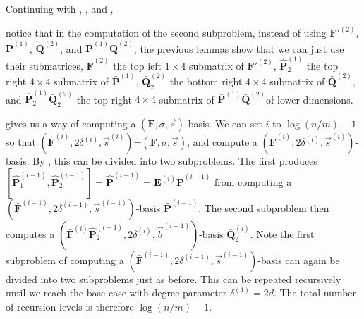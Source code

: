 \begin{example}
Continuing with , ,
and , %
\begin{comment}
notice that after the first subproblem, the second subproblem of computing
$\bar{\mathbf{Q}}^{(2)}$ in \prettyref{exm:subproblems} is really
a smaller problem of computing the lower right $4\times4$ submatrix
$\bar{\mathbf{Q}}_{2}^{(2)}$, which is a $(\bar{\mathbf{F}}^{\left(2\right)}\hat{\mathbf{P}}_{2}^{\left(1\right)},8,\vec{b}^{\left(1\right)})$-basis
(or equivalently a $(\mathbf{F}'^{\left(2\right)}\bar{\mathbf{P}}_{2}^{\left(1\right)},[8,4,4],\vec{b}^{\left(1\right)})$-basis),
where $\bar{\mathbf{P}}_{2}^{\left(1\right)}$ is the last $4$ columns
of $\bar{\mathbf{P}}^{(1)}$, $\vec{b}^{(1)}=[2,3,3,3]$ is the list
of column degrees of $\bar{\mathbf{P}}_{2}^{(1)}$, and $\hat{\mathbf{P}}_{2}^{\left(1\right)}$
is the first $4$ rows of $\bar{\mathbf{P}}_{2}^{(1)}$. 
\end{comment}
notice that in the computation of the second subproblem, instead of
using $\mathbf{F}'^{\left(2\right)},$ $\bar{\mathbf{P}}^{\left(1\right)}$,
$\bar{\mathbf{Q}}^{(2)}$, and $\bar{\mathbf{P}}^{(1)}\bar{\mathbf{Q}}^{(2)}$,
the previous lemmas show that we can just use their submatrices, $\bar{\mathbf{F}}^{(2)}$
the top left $1\times4$ submatrix of $\mathbf{F}'^{\left(2\right)}$,
$\hat{\mathbf{P}}_{2}^{(1)}$ the top right $4\times4$ submatrix
of $\bar{\mathbf{P}}^{(1)}$, $\bar{\mathbf{Q}}_{2}^{(2)}$ the bottom
right $4\times4$ submatrix of $\bar{\mathbf{Q}}^{(2)}$, and $\hat{\mathbf{P}}_{2}^{(1)}\bar{\mathbf{Q}}_{2}^{(2)}$
the top right $4\times4$ submatrix of $\bar{\mathbf{P}}^{(1)}\bar{\mathbf{Q}}^{(2)}$of
lower dimensions. 
\end{example}
 gives us a way of computing
a $\left(\mathbf{F},\sigma,\vec{s}\right)$-basis. We can set $i$
to $\log\left(n/m\right)-1$ so that $(\bar{\mathbf{F}}^{\left(i\right)},2\delta^{\left(i\right)},\vec{s}^{\left(i\right)})$=$\left(\mathbf{F},\sigma,\vec{s}\right)$,
and compute a $(\bar{\mathbf{F}}^{\left(i\right)},2\delta^{\left(i\right)},\vec{s}^{\left(i\right)})$-basis.
By , this can be divided into
two subproblems. The first produces $[\hat{\mathbf{P}}_{1}^{\left(i-1\right)},\hat{\mathbf{P}}_{2}^{\left(i-1\right)}]=\hat{\mathbf{P}}^{\left(i-1\right)}=\mathbf{E}^{\left(i\right)}\bar{\mathbf{P}}^{\left(i-1\right)}$
from computing a $(\bar{\mathbf{F}}^{\left(i-1\right)},2\delta^{\left(i-1\right)},\vec{s}^{\left(i-1\right)})$-basis
$\bar{\mathbf{P}}^{\left(i-1\right)}$. The second subproblem then
computes a $(\bar{\mathbf{F}}^{\left(i\right)}\hat{\mathbf{P}}_{2}^{\left(i-1\right)},2\delta^{\left(i\right)},\vec{b}^{\left(i-1\right)})$-basis
$\bar{\mathbf{Q}}_{2}^{\left(i\right)}$. Note the first subproblem
of computing a $(\bar{\mathbf{F}}^{\left(i-1\right)},2\delta^{\left(i-1\right)},\vec{s}^{\left(i-1\right)})$-basis
can again be divided into two subproblems just as before. This can
be repeated recursively until we reach the base case with degree parameter
$\delta^{\left(1\right)}=2d$. The total number of recursion levels
is therefore $\log\left(n/m\right)-1$.


